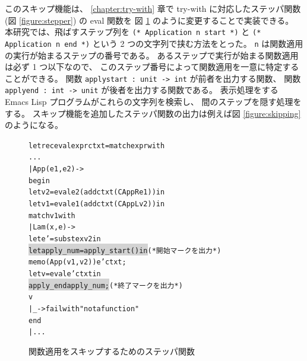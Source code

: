 このスキップ機能は、
\ref{chapter:try-with} 章で try-with に対応したステッパ関数
(図 \ref{figure:stepper}) の eval 関数を
図 \ref{figure:skipapp} のように変更することで実装できる。
本研究では、飛ばすステップ列を
\texttt{(* Application n start *)} と \texttt{(* Application n end *)}
という 2 つの文字列で挟む方法をとった。
\texttt{n} は関数適用の実行が始まるステップの番号である。
あるステップで実行が始まる関数適用は必ず 1 つ以下なので、
このステップ番号によって関数適用を一意に特定することができる。
関数 \texttt{apply\US start :\ unit -> int} が前者を出力する関数、
関数 \texttt{apply\US end :\ int -> unit} が後者を出力する関数である。
表示処理をする Emacs Lisp プログラムがこれらの文字列を検索し、
間のステップを隠す処理をする。
スキップ機能を追加したステッパ関数の出力は例えば図 \ref{figure:skipping} のようになる。

\begin{figure}
\begin{alltt}
let rec eval expr ctxt = match expr with
    ...
  | App (e1, e2) ->
    begin
      let v2 = eval e2 (add ctxt (CAppR e1)) in
      let v1 = eval e1 (add ctxt (CAppL v2)) in
      match v1 with
        | Lam (x, e) ->
          let e' = subst e x v2 in
          \colorbox{lightgray}{let apply_num = apply_start () in}               (* 開始マークを出力 *)
          memo (App (v1, v2)) e' ctxt;
          let v = eval e' ctxt in
          \colorbox{lightgray}{apply_end apply_num;}                            (* 終了マークを出力 *)
          v
        | _ -> failwith "not a function"
    end
  | ...
\end{alltt}
\caption{関数適用をスキップするためのステッパ関数}
\label{figure:skipapp}
\end{figure}

